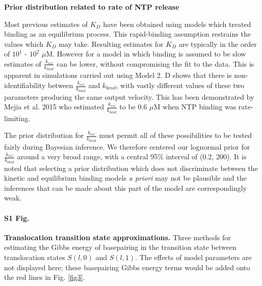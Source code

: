 \documentclass[10pt,letterpaper]{article}
\newenvironment{changemargin}[2]{%
\begin{list}{}{%
\setlength{\topsep}{0pt}%
\setlength{\leftmargin}{#1}%
\setlength{\rightmargin}{#2}%
\setlength{\listparindent}{\parindent}%
\setlength{\itemindent}{\parindent}%
\setlength{\parsep}{\parskip}%
}%
\item[]}{\end{list}}
\begin{document}
\textbf{Prior distribution related to rate of NTP release} \par



Most previous estimates of $K_D$ have been obtained using models which treated binding as an equilibrium process. This rapid-binding assumption restrains the values which $K_D$ may take. Resulting estimates for $K_D$ are typically in the order of $10^1$ - $10^2$ $\mu$M. However for a model in which binding is assumed to be slow estimates of $\frac{k_{rel}}{k_{bind}}$ can be lower, without compromising the fit to the data. This is apparent in simulations carried out using Model 2. D shows that there is non-identifiability between $\frac{k_{rel}}{k_{bind}}$ and $k_{bind}$, with vastly different values of these two parameters producing the same output velocity. This has been demonstrated by Mejia et al. 2015 \cite{mejia2015trigger} who estimated $\frac{k_{rel}}{k_{bind}}$ to be $0.6$ $
\mu$M when NTP binding was rate-limiting. 

The prior distribution for $\frac{k_{rel}}{k_{bind}}$ must permit all of these possibilities to be tested fairly during Bayesian inference. We therefore centered our lognormal prior for $\frac{k_{rel}}{k_{bind}}$ around a very broad range, with a central 95\% interval of (0.2, 200). It is noted that selecting a prior distribution which does not discriminate between the kinetic and equilibrium binding models \textit{a priori} may not be plausible and the inferences that can be made about this part of the model are correspondingly weak.















\paragraph*{S1 Fig.}
\label{S1_Fig}
{\bf Translocation transition state approximations.} Three methods for estimating the Gibbs energy of basepairing in the transition state between translocation states $S(l,0)$ and $S(l,1)$. The effects of model parameters are not displayed here; these basepairing Gibbs energy terms would be added onto the red lines in Fig. \ref{fig3}.
\end{document}
